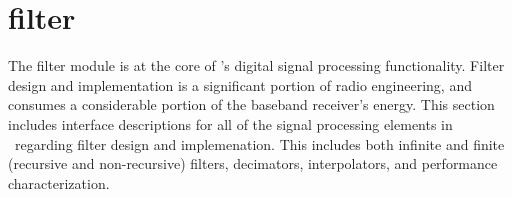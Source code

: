 % 
%

\newpage
\section{filter}
\label{module:filter}
The filter module is at the core of \liquid's digital signal processing
functionality.
Filter design and implementation is a significant portion of radio
engineering, and consumes a considerable portion of the baseband receiver's
energy.
%
This section includes interface descriptions for all of the signal
processing elements in \liquid\ regarding filter design and
implemenation.
This includes both infinite and finite (recursive and non-recursive)
filters, decimators, interpolators, and performance characterization.


% 
%
